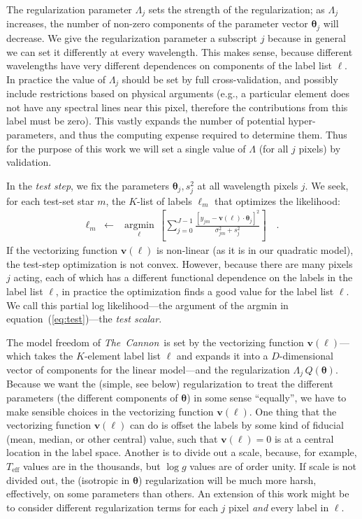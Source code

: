 \documentclass[12pt,preprint]{aastex}
\newcommand{\project}[1]{\textsl{#1}}
\newcommand{\TheCannon}{\project{The~Cannon}}
\newcommand{\logg}{\log g}
\newcommand{\Teff}{T_{\mathrm{eff}}}
\newcommand{\Dvector}[1]{\boldsymbol{#1}}
\newcommand{\vectheta}{\Dvector{\theta}}
\newcommand{\vecv}{\Dvector{v}}
\newcommand{\argmin}[1]{\underset{#1}{\operatorname{argmin}}\,}
\begin{document}
The regularization parameter $\Lambda_j$ sets the strength of the 
regularization; as $\Lambda_j$ increases, the number of non-zero components of 
the parameter vector $\vectheta_j$ will decrease.  We give the regularization 
parameter a subscript $j$ because in general we can set it differently at every
wavelength.  This makes sense, because different wavelengths have very different
dependences on components of the label list $\ell$.  In practice the
value of $\Lambda_j$ should be set by full cross-validation, and possibly 
include restrictions based on physical arguments (e.g., a particular element 
does not have any spectral lines near this pixel, therefore the contributions
from this label must be zero).  This vastly expands the number of potential 
hyper-parameters, and thus the computing expense required to determine them.  
Thus for the purpose of this work we will set a single value of $\Lambda$ (for 
all $j$ pixels) by validation.


In the \emph{test step}, we fix the parameters $\vectheta_j,s^2_j$ at all
wavelength pixels $j$.  We seek, for each test-set star $m$, the $K$-list of 
labels $\ell_m$ that optimizes the likelihood:
\begin{eqnarray}\label{eq:test}
  \ell_m &\leftarrow& \argmin{\ell}\left[
    \sum_{j=0}^{J-1} \frac{[y_{jm}-\vecv(\ell)\cdot\vectheta_j]^2}{\sigma^2_{jm}+s^2_j}
    \right]
  \quad .
\end{eqnarray}
If the vectorizing function $\vecv(\ell)$ is non-linear (as it is in our 
quadratic model), the test-step optimization is not convex.  However, because
there are many pixels $j$ acting, each of which has a different functional
dependence on the labels in the label list $\ell$, in practice the optimization 
finds a good value for the label list $\ell$.  We call
this partial log likelihood---the argument of the argmin in 
equation~(\ref{eq:test})---the \emph{test scalar}.


The model freedom of \TheCannon\ is set by the vectorizing function 
$\vecv(\ell)$---which takes the $K$-element label list $\ell$ and expands it 
into a $D$-dimensional vector of components for the linear model---and the 
regularization $\Lambda_j\,Q(\vectheta)$.  Because we want the (simple, see 
below) regularization to treat the different parameters (the different 
components of $\vectheta$) in some sense ``equally'', we have to make sensible 
choices in the vectorizing function $\vecv(\ell)$.  One thing that the 
vectorizing function $\vecv(\ell)$ can do is offset the labels by some kind of
fiducial (mean, median, or other central) value, such that $\vecv(\ell)=0$ is at
a central location in the label space.  Another is to divide out a scale, 
because, for example, $\Teff$ values are in the thousands, but $\logg$ values
are of order unity.  If scale is not divided out, the (isotropic in $\vectheta$)
regularization will be much more harsh, effectively, on some parameters than 
others.  An extension of this work might be to consider different regularization
terms for each $j$ pixel \emph{and} every label in $\ell$.
\end{document}
